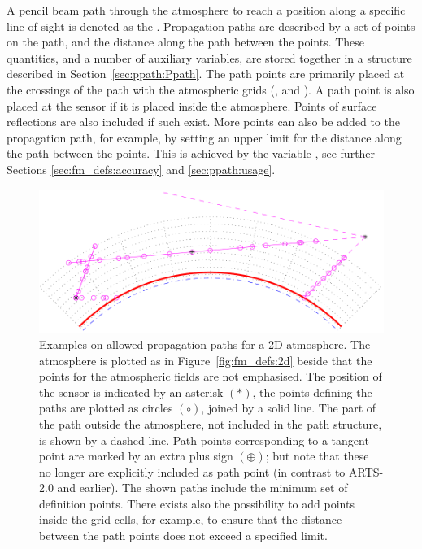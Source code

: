 A pencil beam path through the atmosphere to reach a position along a specific
line-of-sight is denoted as the . Propagation paths
are described by a set of points on the path, and the distance along the path
between the points. These quantities, and a number of auxiliary variables, are
stored together in a structure described in Section~\ref{sec:ppath:Ppath}. The
path points are primarily placed at the crossings of the path with the
atmospheric grids (,  and
). A path point is also placed at the sensor if it is
placed inside the atmosphere. Points of surface reflections
are also included if such exist. More points can also be added to the
propagation path, for example, by setting an upper limit for the distance along
the path between the points. This is achieved by the variable
, see further Sections \ref{sec:fm_defs:accuracy} and
\ref{sec:ppath:usage}.

\begin{figure}[p]
 \begin{center}
  \includegraphics*[width=0.99\hsize]{ppath_cases2}
  \caption{Examples on allowed propagation paths for a 2D atmosphere. The
    atmosphere is plotted as in Figure~\ref{fig:fm_defs:2d} beside that the
    points for the atmospheric fields are not emphasised. The position of the
    sensor is indicated by an asterisk $(\ast)$, the points defining the paths
    are plotted as circles $(\circ)$, joined by a solid line. The part of the
    path outside the atmosphere, not included in the path structure, is shown
    by a dashed line. Path points corresponding to a tangent point are marked
    by an extra plus sign $(\oplus)$; but note that these no longer are
    explicitly included as path point (in contrast to ARTS-2.0 and earlier).
    The shown paths include the minimum set of definition points. There exists
    also the possibility to add points inside the grid cells, for example, to
    ensure that the distance between the path points does not exceed a
    specified limit.}
  \label{fig:fm_defs:ppath_cases2}
 \end{center}
\end{figure}

